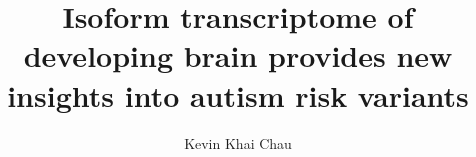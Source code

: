 %
%

\title{Isoform transcriptome of developing brain provides new insights into autism risk variants}

\author{Kevin Khai Chau}







